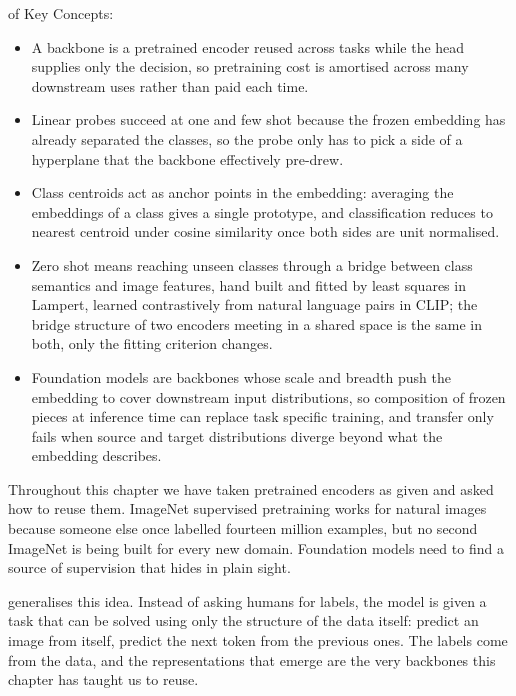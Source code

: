 \vspace{1.5em}

 of Key Concepts:

\begin{itemize}
    \item A backbone is a pretrained encoder reused across tasks while the head supplies only the decision, so pretraining cost is amortised across many downstream uses rather than paid each time.
    \item Linear probes succeed at one and few shot because the frozen embedding has already separated the classes, so the probe only has to pick a side of a hyperplane that the backbone effectively pre-drew.
    \item Class centroids act as anchor points in the embedding: averaging the embeddings of a class gives a single prototype, and classification reduces to nearest centroid under cosine similarity once both sides are unit normalised.
    \item Zero shot means reaching unseen classes through a bridge between class semantics and image features, hand built and fitted by least squares in Lampert, learned contrastively from natural language pairs in CLIP; the bridge structure of two encoders meeting in a shared space is the same in both, only the fitting criterion changes.
    \item Foundation models are backbones whose scale and breadth push the embedding to cover downstream input distributions, so composition of frozen pieces at inference time can replace task specific training, and transfer only fails when source and target distributions diverge beyond what the embedding describes.
\end{itemize}

\vspace{2.5em}


 Throughout this chapter we have
taken pretrained encoders as given and asked how to reuse them.
ImageNet supervised pretraining works for natural images because someone
else once labelled fourteen million examples, but no second ImageNet is being
built for every new domain. Foundation models need to find a source of supervision that hides
in plain sight.

 generalises this idea.
Instead of asking humans for labels, the model is given a task 
that can be solved using only the structure of the data itself: 
predict an image from itself, predict the next token from the previous ones. 
The labels come from the data, and the representations that emerge are the very backbones 
this chapter has taught us to reuse.



